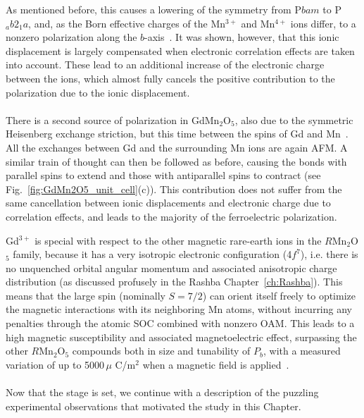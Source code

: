 As mentioned before, this causes a lowering of the symmetry from P$bam$ to P$_ab2_1a$, and, as the Born effective charges of the Mn$^{3+}$ and Mn$^{4+}$ ions differ, to a nonzero polarization along the $b$-axis~\cite{Khomskii2009}.
It was shown, however, that this ionic displacement is largely compensated when electronic correlation effects are taken into account.
These lead to an additional increase of the electronic charge between the ions, which almost fully cancels the positive contribution to the polarization due to the ionic displacement.
\\\\
There is a second source of polarization in GdMn$_2$O$_5$, also due to the symmetric Heisenberg exchange striction, but this time between the spins of Gd and Mn~\cite{Lee13}.
All the exchanges between Gd and the surrounding Mn ions are again AFM.
A similar train of thought can then be followed as before, causing the bonds with parallel spins to extend and those with antiparallel spins to contract (see Fig.~\ref{fig:GdMn2O5_unit_cell}(c)).
This contribution does not suffer from the same cancellation between ionic displacements and electronic charge due to correlation effects, and leads to the majority of the ferroelectric polarization.

Gd$^{3+}$ is special with respect to the other magnetic rare-earth ions in the $R$Mn$_2$O$_5$ family, because it has a very isotropic electronic configuration (4$f^7$), i.e. there is no unquenched orbital angular momentum and associated anisotropic charge distribution (as discussed profusely in the Rashba Chapter~\ref{ch:Rashba}). This means that the large spin (nominally $S=7/2$) can orient itself freely to optimize the magnetic interactions with its neighboring Mn atoms, without incurring any penalties through the atomic SOC combined with nonzero OAM.
This leads to a high magnetic susceptibility and associated magnetoelectric effect, surpassing the other $R$Mn$_2$O$_5$ compounds both in size and tunability of $P_b$, with a measured variation of up to 5000\,$\mu$ C/m$^2$ when a magnetic field is applied~\cite{Lee13}. 
\\\\
Now that the stage is set, we continue with a description of the puzzling experimental observations that motivated the study in this Chapter.

